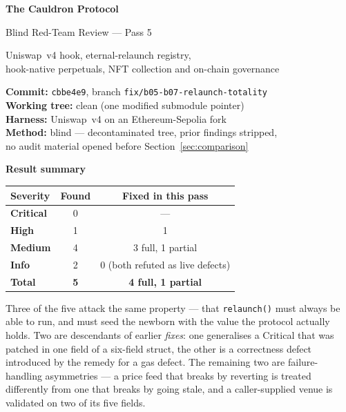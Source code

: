 \documentclass[11pt,a4paper]{article}
\newcommand{\SevCrit}{\textcolor{critical}{\textbf{Critical}}}
\newcommand{\SevHigh}{\textcolor{high}{\textbf{High}}}
\newcommand{\SevMed}{\textcolor{medium}{\textbf{Medium}}}
\newcommand{\SevInfo}{\textcolor{info}{\textbf{Info}}}
\newcommand{\code}[1]{\texttt{\small #1}}
\begin{document}
\begin{titlepage}
\centering
\vspace*{2.2cm}
{\Huge\bfseries\color{ink} The Cauldron Protocol\par}
\vspace{0.5cm}
{\LARGE\color{slate} Blind Red-Team Review --- Pass 5\par}
\vspace{0.3cm}
{\large\color{slate} Uniswap~v4 hook, eternal-relaunch registry,\\
hook-native perpetuals, NFT collection and on-chain governance\par}

\vspace{1.6cm}
\begin{tcolorbox}[width=0.88\linewidth,colback=panel,colframe=rule,boxrule=0.8pt,arc=2pt]
\centering\small
\textbf{Commit:} \code{cbbe4e9}, branch \code{fix/b05-b07-relaunch-totality}\\[3pt]
\textbf{Working tree:} clean (one modified submodule pointer)\\[3pt]
\textbf{Harness:} Uniswap~v4 on an Ethereum-Sepolia fork\\[3pt]
\textbf{Method:} blind --- decontaminated tree, prior findings stripped,\\
no audit material opened before Section~\ref{sec:comparison}
\end{tcolorbox}

\vspace{1.0cm}
{\large\bfseries Result summary\par}
\vspace{0.35cm}
\begin{tabular}{@{}lcc@{}}
\toprule
\textbf{Severity} & \textbf{Found} & \textbf{Fixed in this pass} \\
\midrule
\SevCrit  & 0 & --- \\
\SevHigh  & 1 & 1 \\
\SevMed   & 4 & 3 full, 1 partial \\
\SevInfo  & 2 & 0 (both refuted as live defects) \\
\midrule
\textbf{Total} & \textbf{5} & \textbf{4 full, 1 partial} \\
\bottomrule
\end{tabular}

\vspace{0.9cm}
\begin{tcolorbox}[width=0.88\linewidth,colback=panel,colframe=high,boxrule=1pt,arc=2pt]
\small
Three of the five attack the same property --- that \code{relaunch()} must always be
able to run, and must seed the newborn with the value the protocol actually holds.
Two are descendants of earlier \emph{fixes}: one generalises a Critical that was
patched in one field of a six-field struct, the other is a correctness defect
introduced by the remedy for a gas defect. The remaining two are failure-handling
asymmetries --- a price feed that breaks by reverting is treated differently from one
that breaks by going stale, and a caller-supplied venue is validated on two of its
five fields.
\end{tcolorbox}


\end{titlepage}
\end{document}
